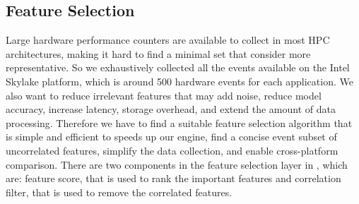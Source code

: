 \subsection{Feature Selection}
Large hardware performance counters are available to collect in most HPC architectures, making it hard to find a minimal set that consider more representative. So we exhaustively collected all the events available on the Intel Skylake platform, which is around 500 hardware events for each application.
We also want to reduce irrelevant features that may add noise, reduce model accuracy, increase latency, storage overhead, and extend the amount of data processing. 
Therefore we have to find a suitable feature selection algorithm that is simple and efficient to speeds up our engine, 
find a concise event subset of uncorrelated features, simplify the data collection, and enable cross-platform comparison. There are two components in the feature selection layer in \us, which are: feature score, that is used to rank the important features and correlation filter, that is used to remove the correlated features. 

